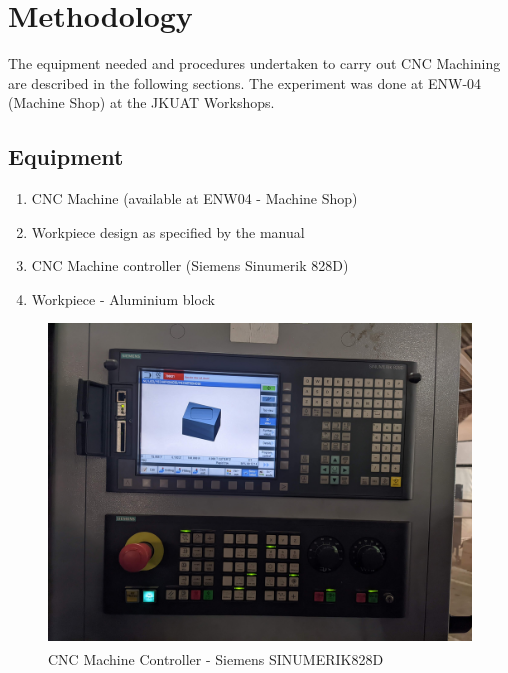 \section{Methodology}
\lhead{\leftmark}
The equipment needed and procedures undertaken to carry out CNC Machining are described in the following sections. The experiment was done at ENW-04 (Machine Shop) at the JKUAT Workshops.
\subsection{Equipment}
\begin{enumerate}
\item CNC Machine (available at ENW04 - Machine Shop)
\item Workpiece design as specified by the manual
\item CNC Machine controller (Siemens Sinumerik 828D)
\item Workpiece - Aluminium block 
\end{enumerate}
\begin{figure}[h!]
	\centering
	\includegraphics[width=0.7\linewidth]{Figures/machinecontroller}
	\caption[CNC Machine Controller]{CNC Machine Controller - Siemens SINUMERIK\textsuperscript\textregistered 828D} 
	\label{fig:cnccontroller}
\end{figure}

